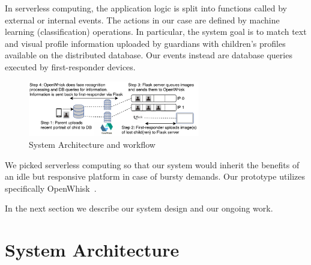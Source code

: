\documentclass[sigconf]{acmart}
\begin{document}
In serverless computing, the application logic is split into functions called by external or internal events. 
%
The actions in our case are defined by machine learning (classification) operations. In particular, the system goal is to match text and visual profile information uploaded by guardians with children's profiles available on the distributed database.  Our events instead are database queries executed by first-responder devices.


\begin{figure}[h]
\begin{center}
\includegraphics[width=75mm, scale=1]{framework.pdf}
\vspace*{-5mm}
\caption{\footnotesize{System Architecture and workflow}
}
\label{figure1}
\end{center}
\vspace*{-6mm}
\end{figure}


We picked serverless computing so that our system would inherit the benefits of an idle but responsive platform in case of bursty demands.
Our prototype utilizes specifically OpenWhisk~\cite{openwhisk}.

In the next section we describe our system design and our ongoing work.



\section{System Architecture}
\label{sec:frame}

\end{document}
